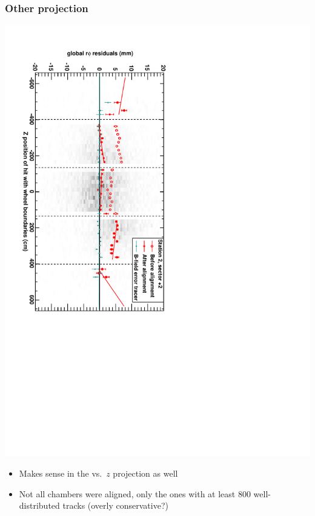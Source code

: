 \documentclass[compress]{beamer}
\begin{document}
\begin{frame}
\frametitle{Other projection}

\includegraphics[height=\linewidth, angle=90]{DTrphiVsZ_st2_sr02.pdf}

\begin{itemize}
\item Makes sense in the vs.\ $z$ projection as well
\item Not all chambers were aligned, only the ones with at least 800
  well-distributed tracks (overly conservative?)
\end{itemize}
\end{frame}
\end{document}
